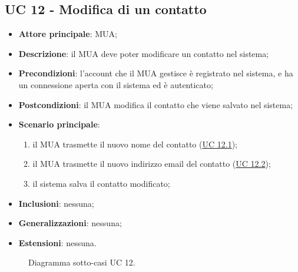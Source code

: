 \subsection{UC 12 - Modifica di un contatto} \label{sec:UC12}
    \begin{itemize}
        \item \textbf{Attore principale}: MUA;
        \item \textbf{Descrizione}: il MUA deve poter modificare un contatto nel sistema;
        \item \textbf{Precondizioni}: l’account che il MUA gestisce è registrato nel sistema, e ha un connessione aperta con il sistema ed è autenticato;
        \item \textbf{Postcondizioni}: il MUA modifica il contatto che viene salvato nel sistema;
        \item \textbf{Scenario principale}:
            \begin{enumerate}
                \item il MUA trasmette il nuovo nome del contatto (\hyperref[sec:UC12.1]{UC 12.1});
                \item il MUA trasmette il nuovo indirizzo email del contatto (\hyperref[sec:UC12.2]{UC 12.2});
                \item il sistema salva il contatto modificato;
            \end{enumerate}
        \item \textbf{Inclusioni}: nessuna;
        \item \textbf{Generalizzazioni}: nessuna;
        \item \textbf{Estensioni}: nessuna.
    \end{itemize}

\begin{figure}[h]
    \centering
    \caption{Diagramma sotto-casi UC 12.}
\end{figure}

